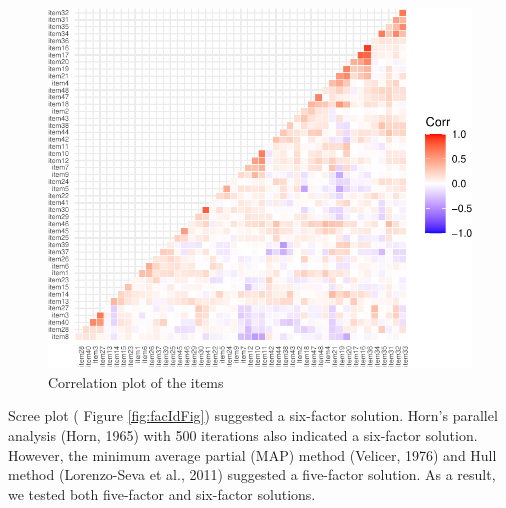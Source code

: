 \documentclass[
  english,
  man]{apa6}
\begin{document}
\begin{center}
\begin{ThreePartTable}
\end{ThreePartTable}
\end{center}

\begin{figure}

{\centering \includegraphics[width=1\linewidth,height=1.5\textheight]{manuscript_files/figure-latex/figCor-1} 

}

\caption{Correlation plot of the items}\label{fig:figCor}
\end{figure}

Scree plot ( Figure \ref{fig:facIdFig}) suggested a six-factor solution. Horn's parallel analysis (Horn, 1965) with 500 iterations also indicated a six-factor solution. However, the minimum average partial (MAP) method (Velicer, 1976) and Hull method (Lorenzo-Seva et al., 2011) suggested a five-factor solution. As a result, we tested both five-factor and six-factor solutions.
\end{document}
